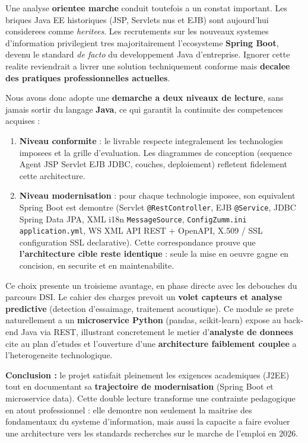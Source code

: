 Une analyse \textbf{orientee marche} conduit toutefois a un constat important.
Les briques Java EE historiques (JSP, Servlets \og nus \fg{} et EJB) sont
aujourd'hui considerees comme \emph{heritees}. Les recrutements sur les nouveaux
systemes d'information privilegient tres majoritairement l'ecosysteme
\textbf{Spring Boot}, devenu le standard \emph{de facto} du developpement Java
d'entreprise. Ignorer cette realite reviendrait a livrer une solution
techniquement conforme mais \textbf{decalee des pratiques professionnelles
actuelles}.

Nous avons donc adopte une \textbf{demarche a deux niveaux de lecture}, sans
jamais sortir du langage \textbf{Java}, ce qui garantit la continuite des
competences acquises :
\begin{enumerate}
  \item \textbf{Niveau conformite} : le livrable respecte integralement les
        technologies imposees et la grille d'evaluation. Les diagrammes de
        conception (sequence Agent \textrightarrow{} JSP \textrightarrow{}
        Servlet \textrightarrow{} EJB \textrightarrow{} JDBC, couches,
        deploiement) refletent fidelement cette architecture.
  \item \textbf{Niveau modernisation} : pour chaque technologie imposee, son
        equivalent Spring Boot est demontre (Servlet \textrightarrow{}
        \texttt{@RestController}, EJB \textrightarrow{} \texttt{@Service}, JDBC
        \textrightarrow{} Spring Data JPA, XML i18n \textrightarrow{}
        \texttt{MessageSource}, \texttt{ConfigZumm.ini} \textrightarrow{}
        \texttt{application.yml}, WS XML \textrightarrow{} API REST + OpenAPI,
        X.509 / SSL \textrightarrow{} configuration SSL declarative). Cette
        correspondance prouve que \textbf{l'architecture cible reste identique} :
        seule la mise en oeuvre gagne en concision, en securite et en
        maintenabilite.
\end{enumerate}

Ce choix presente un troisieme avantage, en phase directe avec les debouches du
parcours DSI. Le cahier des charges prevoit un \textbf{volet capteurs et analyse
predictive} (detection d'essaimage, traitement acoustique). Ce module se prete
naturellement a un \textbf{microservice Python} (pandas, scikit-learn) expose au
back-end Java via REST, illustrant concretement le metier d'\textbf{analyste de
donnees} cite au plan d'etudes et l'ouverture d'une \textbf{architecture
faiblement couplee} a l'heterogeneite technologique.

\begin{encadre}
\textbf{Conclusion :} le projet satisfait pleinement les exigences academiques
(J2EE) tout en documentant sa \textbf{trajectoire de modernisation} (Spring Boot
et microservice data). Cette double lecture transforme une contrainte
pedagogique en atout professionnel : elle demontre non seulement la maitrise des
fondamentaux du systeme d'information, mais aussi la capacite a faire evoluer une
architecture vers les standards recherches sur le marche de l'emploi en 2026.
\end{encadre}